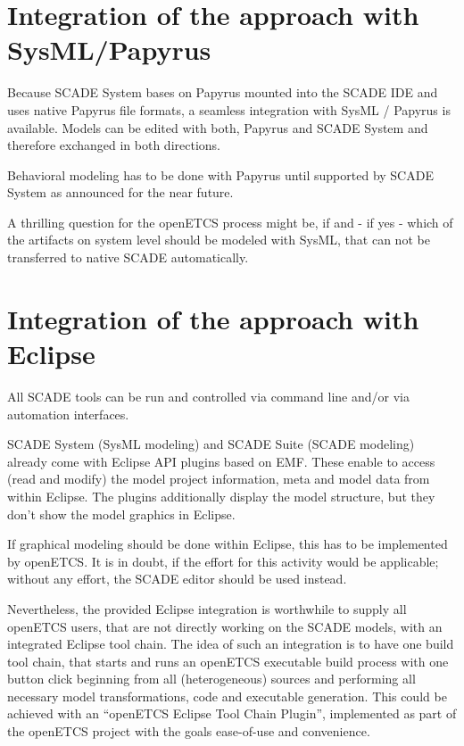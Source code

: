 \section{Integration of the approach with SysML/Papyrus}

Because SCADE System bases on Papyrus mounted into the SCADE IDE and uses native Papyrus file formats, a seamless integration with SysML / Papyrus is available.
Models can be edited with both, Papyrus and SCADE System and therefore exchanged in both directions. 

Behavioral modeling has to be done with Papyrus until supported by SCADE System as announced for the near future. 

A thrilling question for the openETCS process might be, if and - if yes - which of the artifacts on system level should be modeled with SysML, that can not be transferred to native SCADE automatically. 


\section{Integration of the approach with Eclipse}

All SCADE tools can be run and controlled via command line and/or via automation interfaces. 

SCADE System (SysML modeling) and SCADE Suite (SCADE modeling) already come with Eclipse API plugins based on EMF. These enable to access (read and modify) the model project information, meta and model data from within Eclipse. 
The plugins additionally display the model structure, but they don't show the model graphics in Eclipse. 

If graphical modeling should be done within Eclipse, this has to be implemented by openETCS. It is in doubt, if the effort for this activity would be applicable; without any effort, the SCADE editor should be used instead. 
 
Nevertheless, the provided Eclipse integration is worthwhile to supply all openETCS users, that are not directly working on the SCADE models, with an integrated Eclipse tool chain. 
The idea of such an integration is to have one build tool chain, that starts and runs an openETCS executable build process with one button click beginning from all (heterogeneous) sources and performing all necessary model transformations, code and executable generation. 
This could be achieved with an "`openETCS Eclipse Tool Chain Plugin"', implemented as part of the openETCS project with the goals ease-of-use and convenience. 


